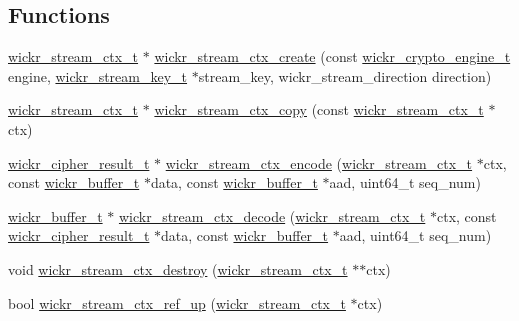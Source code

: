 \subsection*{Functions}
\begin{DoxyCompactItemize}
\item 
\mbox{\hyperlink{structwickr__stream__ctx}{wickr\+\_\+stream\+\_\+ctx\+\_\+t}} $\ast$ \mbox{\hyperlink{group__wickr__stream_ga0b5c513a3e0958dc7fd4f8455206e32e}{wickr\+\_\+stream\+\_\+ctx\+\_\+create}} (const \mbox{\hyperlink{structwickr__crypto__engine}{wickr\+\_\+crypto\+\_\+engine\+\_\+t}} engine, \mbox{\hyperlink{structwickr__stream__key}{wickr\+\_\+stream\+\_\+key\+\_\+t}} $\ast$stream\+\_\+key, wickr\+\_\+stream\+\_\+direction direction)
\item 
\mbox{\hyperlink{structwickr__stream__ctx}{wickr\+\_\+stream\+\_\+ctx\+\_\+t}} $\ast$ \mbox{\hyperlink{group__wickr__stream_ga707b685e35eb437c33f5ec32c6760005}{wickr\+\_\+stream\+\_\+ctx\+\_\+copy}} (const \mbox{\hyperlink{structwickr__stream__ctx}{wickr\+\_\+stream\+\_\+ctx\+\_\+t}} $\ast$ctx)
\item 
\mbox{\hyperlink{structwickr__cipher__result}{wickr\+\_\+cipher\+\_\+result\+\_\+t}} $\ast$ \mbox{\hyperlink{group__wickr__stream_ga621a3ec801ab996b4fab1fe905c450bd}{wickr\+\_\+stream\+\_\+ctx\+\_\+encode}} (\mbox{\hyperlink{structwickr__stream__ctx}{wickr\+\_\+stream\+\_\+ctx\+\_\+t}} $\ast$ctx, const \mbox{\hyperlink{structwickr__buffer}{wickr\+\_\+buffer\+\_\+t}} $\ast$data, const \mbox{\hyperlink{structwickr__buffer}{wickr\+\_\+buffer\+\_\+t}} $\ast$aad, uint64\+\_\+t seq\+\_\+num)
\item 
\mbox{\hyperlink{structwickr__buffer}{wickr\+\_\+buffer\+\_\+t}} $\ast$ \mbox{\hyperlink{group__wickr__stream_gaa1eb323694f2c1652b51127b0b89138c}{wickr\+\_\+stream\+\_\+ctx\+\_\+decode}} (\mbox{\hyperlink{structwickr__stream__ctx}{wickr\+\_\+stream\+\_\+ctx\+\_\+t}} $\ast$ctx, const \mbox{\hyperlink{structwickr__cipher__result}{wickr\+\_\+cipher\+\_\+result\+\_\+t}} $\ast$data, const \mbox{\hyperlink{structwickr__buffer}{wickr\+\_\+buffer\+\_\+t}} $\ast$aad, uint64\+\_\+t seq\+\_\+num)
\item 
void \mbox{\hyperlink{group__wickr__stream_ga05260bfce1f50352cad32e0354c28a1d}{wickr\+\_\+stream\+\_\+ctx\+\_\+destroy}} (\mbox{\hyperlink{structwickr__stream__ctx}{wickr\+\_\+stream\+\_\+ctx\+\_\+t}} $\ast$$\ast$ctx)
\item 
bool \mbox{\hyperlink{group__wickr__stream_ga98121b9f8cdab6596cbd3bb0d99be6e3}{wickr\+\_\+stream\+\_\+ctx\+\_\+ref\+\_\+up}} (\mbox{\hyperlink{structwickr__stream__ctx}{wickr\+\_\+stream\+\_\+ctx\+\_\+t}} $\ast$ctx)
\end{DoxyCompactItemize}


